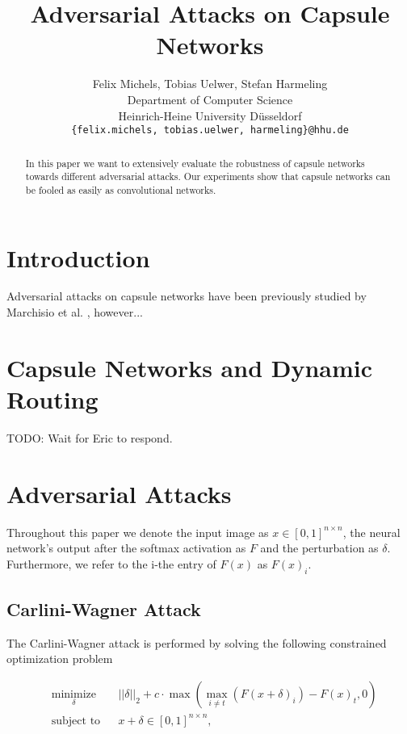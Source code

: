 \documentclass{article}
\title{Adversarial Attacks on Capsule Networks}
\author{%
  Felix Michels, Tobias Uelwer, Stefan Harmeling \\
  Department of Computer Science\\
  Heinrich-Heine University Düsseldorf\\
  \texttt{\{felix.michels, tobias.uelwer, harmeling\}@hhu.de} \\
}
\begin{document}
\maketitle

\begin{abstract}
	In this paper we want to extensively evaluate the robustness of capsule networks towards different adversarial attacks. Our experiments show that capsule networks can be fooled as easily as convolutional networks.

\end{abstract}

\section{Introduction}

Adversarial attacks on capsule networks have been previously studied by Marchisio et al. \cite{marchisio}, however...

\section{Capsule Networks and Dynamic Routing}

TODO: Wait for Eric to respond.
\cite{capsules}

\section{Adversarial Attacks}

Throughout this paper we denote the input image as $x\in [0,1]^{n\times n}$, the neural network's output after the softmax activation as $F$ and the perturbation as $\delta$. Furthermore, we refer to the i-the entry of $F(x)$ as $F(x)_i$.

\subsection{Carlini-Wagner Attack}

The Carlini-Wagner attack \cite{carlini} is performed by solving the following constrained optimization problem

\begin{equation*}
	\begin{aligned}
	& \underset{\delta}{\text{minimize}}
	& & ||\delta||_2 + c \cdot \max(\max_{i\neq t}(F(x+\delta)_i)-F(x)_t, 0) \\
	& \text{subject to}
	& & x+\delta \in [0,1]^{n \times n},
	\end{aligned}
\end{equation*}
\end{document}

